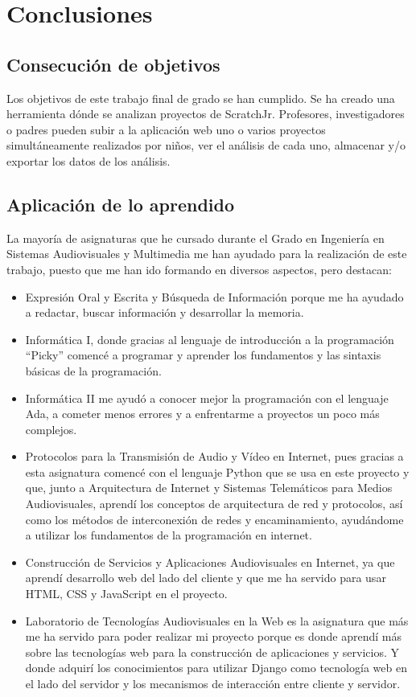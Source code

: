 \documentclass[a4paper, 12pt]{book}
\begin{document}
\cleardoublepage
\chapter{Conclusiones}
\label{chap:conclusiones}


\section{Consecución de objetivos}
\label{sec:consecucion-objetivos}

Los objetivos de este trabajo final de grado se han cumplido. 
Se ha creado una herramienta dónde se analizan proyectos de ScratchJr. 
Profesores, investigadores o padres pueden subir a la aplicación web uno o varios proyectos simultáneamente realizados por niños, ver el análisis de cada uno, almacenar y/o exportar los datos de los análisis.

\section{Aplicación de lo aprendido}
\label{sec:aplicacion_aprendido}

La mayoría de asignaturas que he cursado durante el Grado en Ingeniería en Sistemas Audiovisuales y Multimedia me han ayudado para la realización de este trabajo, puesto que me han ido formando en diversos aspectos, pero destacan:

\begin{itemize}
    \item Expresión Oral y Escrita y Búsqueda de Información porque me ha ayudado a redactar, buscar información y desarrollar la memoria.
    \item Informática I, donde gracias al lenguaje de introducción a la programación ``Picky'' comencé a programar y aprender los fundamentos y las sintaxis básicas de la programación. 
    \item Informática II me ayudó a conocer mejor la programación con el lenguaje Ada, a cometer menos errores y a enfrentarme a proyectos un poco más complejos. 
    \item Protocolos para la Transmisión de Audio y Vídeo en Internet, pues gracias a esta asignatura comencé con el lenguaje Python que se usa en este proyecto y que, junto a Arquitectura de Internet y Sistemas Telemáticos para Medios Audiovisuales, aprendí los conceptos de arquitectura de red y protocolos, así como los métodos de interconexión de redes y encaminamiento, ayudándome a utilizar los fundamentos de la programación en internet.
    \item Construcción de Servicios y Aplicaciones Audiovisuales en Internet, ya que aprendí desarrollo web del lado del cliente y que me ha servido para usar HTML, CSS y JavaScript en el proyecto.
    \item Laboratorio de Tecnologías Audiovisuales en la Web es la asignatura que más me ha servido para poder realizar mi proyecto porque  es donde aprendí más sobre las tecnologías web para la construcción de aplicaciones y servicios.
    Y donde adquirí los conocimientos para utilizar Django como tecnología web en el lado del servidor y los mecanismos de interacción entre cliente y servidor.
\end{itemize}
\end{document}
